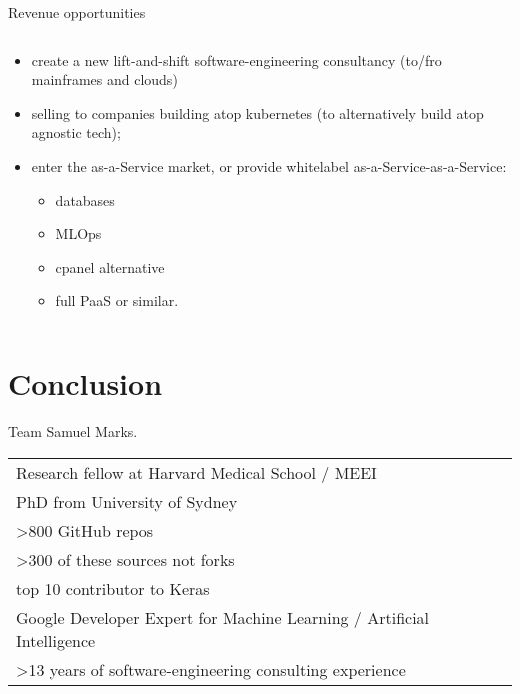 \documentclass[aspectratio=169]{beamer}
\begin{document}
\begin{frame}{Revenue opportunities}
    \begin{columns}
        \begin{column}{0.617\textwidth}
    
\begin{itemize}[<+->]
    \item create a new lift-and-shift software-engineering consultancy (to/fro mainframes and clouds)
    \item selling to companies building atop kubernetes (to alternatively build atop agnostic tech);
    \item enter the as-a-Service market, or provide whitelabel as-a-Service-as-a-Service:
    \begin{itemize}[<+->]
        \item databases
        \item MLOps
        \item cpanel alternative
        \item full PaaS\textellipsis{} or similar.
    \end{itemize}
\end{itemize}
\end{column}
\end{columns}
\end{frame}

\section{Conclusion}

\begin{frame}{Team}
    \centering
  Samuel Marks.

  \vspace{2em}
  \centering
  \begin{center}
    \begin{tabular}{l}
        Research fellow at Harvard Medical School / MEEI \\
        PhD from University of Sydney \\
        >800 GitHub repos \\
        >300 of these sources not forks \\
        top 10 contributor to Keras \\
        Google Developer Expert for Machine Learning / Artificial Intelligence \\
        >13 years of software-engineering consulting experience
    \end{tabular}
  \end{center}
  
\end{frame}
\end{document}
